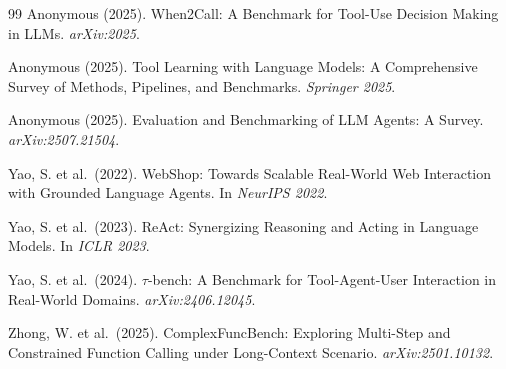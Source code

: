 \documentclass[11pt]{article}
\begin{document}
\begin{thebibliography}{99}
Anonymous (2025).
\newblock When2Call: A Benchmark for Tool-Use Decision Making in LLMs.
\newblock \textit{arXiv:2025}.

Anonymous (2025).
\newblock Tool Learning with Language Models: A Comprehensive Survey of Methods, Pipelines, and Benchmarks.
\newblock \textit{Springer 2025}.

Anonymous (2025).
\newblock Evaluation and Benchmarking of LLM Agents: A Survey.
\newblock \textit{arXiv:2507.21504}.

Yao, S. et al.\ (2022).
\newblock WebShop: Towards Scalable Real-World Web Interaction with Grounded Language Agents.
\newblock In \textit{NeurIPS 2022}.

Yao, S. et al.\ (2023).
\newblock ReAct: Synergizing Reasoning and Acting in Language Models.
\newblock In \textit{ICLR 2023}.

Yao, S. et al.\ (2024).
\newblock $\tau$-bench: A Benchmark for Tool-Agent-User Interaction in Real-World Domains.
\newblock \textit{arXiv:2406.12045}.      

Zhong, W. et al.\ (2025).
\newblock ComplexFuncBench: Exploring Multi-Step and Constrained Function Calling under Long-Context Scenario.
\newblock \textit{arXiv:2501.10132}.

\end{thebibliography}
\end{document}
